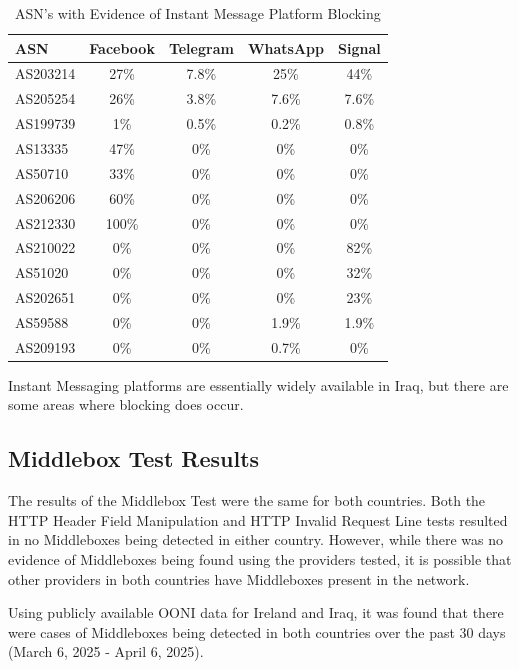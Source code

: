 \begin{table}[H]
\centering
\caption{ASN's with Evidence of Instant Message Platform Blocking}
\begin{tabular}{lcccc}
\toprule
\textbf{ASN} & \textbf{Facebook} & \textbf{Telegram} & \textbf{WhatsApp} & \textbf{Signal} \\
\midrule
AS203214  & 27\%  & 7.8\% & 25\%  & 44\% \\
AS205254  & 26\%  & 3.8\% & 7.6\% & 7.6\% \\
AS199739  & 1\%   & 0.5\% & 0.2\% & 0.8\% \\
AS13335   & 47\%  & 0\%   & 0\%   & 0\% \\
AS50710   & 33\%  & 0\%   & 0\%   & 0\% \\
AS206206  & 60\%  & 0\%   & 0\%   & 0\% \\
AS212330  & 100\% & 0\%   & 0\%   & 0\% \\
AS210022  & 0\%   & 0\%   & 0\%   & 82\% \\
AS51020   & 0\%   & 0\%   & 0\%   & 32\% \\
AS202651  & 0\%   & 0\%   & 0\%   & 23\% \\
AS59588   & 0\%   & 0\%   & 1.9\% & 1.9\% \\
AS209193  & 0\%   & 0\%   & 0.7\% & 0\% \\
\bottomrule
\end{tabular}
\label{tab:category_block}
\end{table}

Instant Messaging platforms are essentially widely available in Iraq, but there are some areas where blocking does occur.

\subsection{Middlebox Test Results}

The results of the Middlebox Test were the same for both countries. Both the HTTP Header Field Manipulation and HTTP Invalid Request Line tests resulted in no Middleboxes being detected in either country. However, while there was no evidence of Middleboxes being found using the providers tested, it is possible that other providers in both countries have Middleboxes present in the network.

Using publicly available OONI data for Ireland and Iraq, it was found that there were cases of Middleboxes being detected in both countries over the past 30 days (March 6, 2025 - April 6, 2025). 

